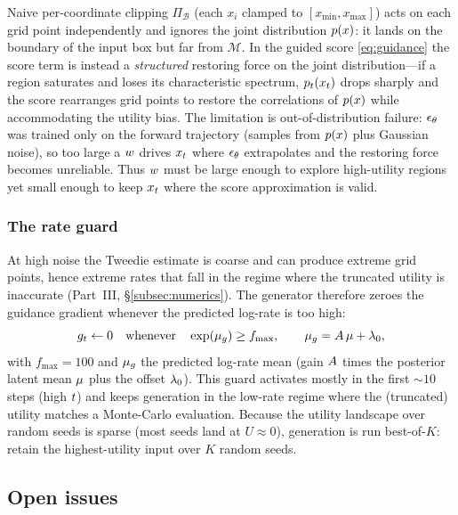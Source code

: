 \begin{remark}
Naive per-coordinate clipping $\Pi_{\mathcal{B}}$ (each $x_{i}$ clamped to
$[x_{\min},x_{\max}]$) acts on each grid point independently and ignores the joint
distribution $p(x)$: it lands on the boundary of the input box but far from
$\mathcal{M}$. In the guided score \eqref{eq:guidance} the score term is instead a
\emph{structured} restoring force on the joint distribution---if a region saturates
and loses its characteristic spectrum, $p_{t}(x_{t})$ drops sharply and the score
rearranges grid points to restore the correlations of $p(x)$ while accommodating the
utility bias. The limitation is out-of-distribution failure: $\epsilon_{\theta}$ was trained
only on the forward trajectory (samples from $p(x)$ plus Gaussian noise), so too
large a $w$ drives $x_{t}$ where $\epsilon_{\theta}$ extrapolates and the restoring force
becomes unreliable. Thus $w$ must be large enough to explore high-utility regions
yet small enough to keep $x_{t}$ where the score approximation is valid.
\end{remark}

\subsubsection{The rate guard}
At high noise the Tweedie estimate is coarse and can produce extreme grid points,
hence extreme rates that fall in the regime where the truncated utility is
inaccurate (Part~III, \S\ref{subsec:numerics}). The generator therefore zeroes the
guidance gradient whenever the predicted log-rate is too high:
\begin{equation}
g_{t}\leftarrow 0
\quad\text{whenever}\quad
\exp(\mu_{g})\ge f_{\max},
\qquad
\mu_{g}=A\,\mu+\lambda_{0},
\label{eq:fmax}
\end{equation}
with $f_{\max}=100$ and $\mu_{g}$ the predicted log-rate mean (gain $A$ times the
posterior latent mean $\mu$ plus the offset $\lambda_{0}$). This guard activates mostly in
the first $\sim\!10$ steps (high $t$) and keeps generation in the low-rate regime
where the (truncated) utility matches a Monte-Carlo evaluation. Because the utility
landscape over random seeds is sparse (most seeds land at $U\!\approx\!0$),
generation is run best-of-$K$: retain the highest-utility input over $K$ random
seeds.

\subsection{Open issues}\label{sec:diff-status}

